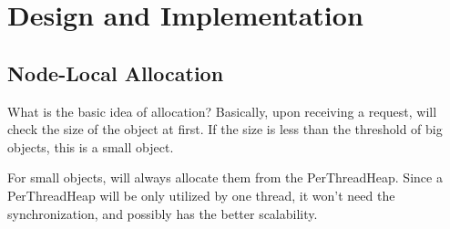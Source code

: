 \section{Design and Implementation}
\label{sec:implement}

\subsection{Node-Local Allocation}

What is the basic idea of allocation? 
Basically, upon receiving a request, \NM{} will check the size of the object at first. If the size is less than the threshold of big objects, this is a small object. 

For small objects, \NM{} will always allocate them from the PerThreadHeap. Since a PerThreadHeap will be only utilized by one thread, it won't need the synchronization, and possibly has the better scalability. 

